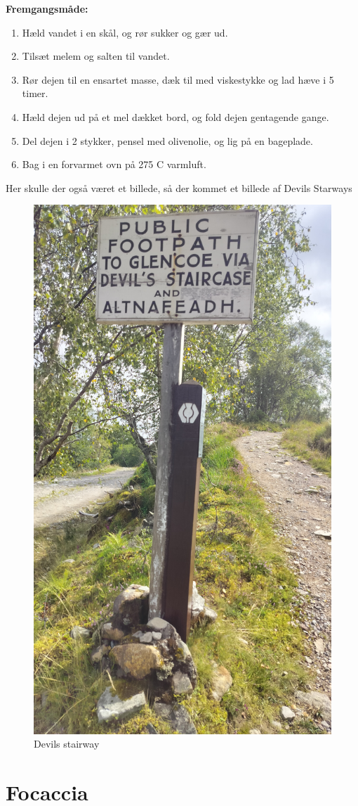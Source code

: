\documentclass{book}
\begin{document}
\begin{minipage}[t]{0.5\textwidth}
\textbf{Fremgangsmåde:}
\begin{enumerate}
    \item Hæld vandet i en skål, og rør sukker og gær ud.
    \item Tilsæt melem og salten til vandet.
    \item Rør dejen til en ensartet masse, dæk til med viskestykke og lad hæve i 5 timer.
    \item Hæld dejen ud på et mel dækket bord, og fold dejen gentagende gange.
    \item Del dejen i 2 stykker, pensel med olivenolie, og lig på en bageplade.
    \item Bag i en forvarmet ovn på 275 \degree C varmluft.
\end{enumerate}
\end{minipage}
\newpage Her skulle der også været et billede, så der kommet et billede af Devils Starways
\begin{figure}
    \centering
    \includegraphics[width=0.5\linewidth]{Devils_stairway.jpg}
    \caption{Devils stairway}
\end{figure}
\newpage \section{Focaccia}
\end{document}
